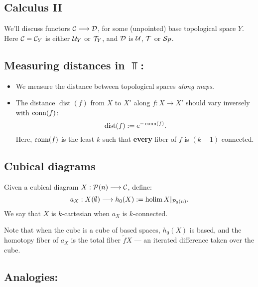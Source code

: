 \documentclass[11pt]{article}
\DeclareMathOperator{\dist}{dist}
\begin{document}
\begin{Calculus II}
\section*{Calculus II}
We'll discuss functors $\mathcal{C}\longrightarrow\mathcal{D}$, for some (unpointed) base topological space $Y$. Here $\mathcal{C}=\mathcal{C}_Y$ is either $\mathcal{U}_Y$ or $\mathcal{T}_Y$, and $\mathcal{D}$ is $\mathcal{U}$, $\mathcal{T}$ or $\mathcal{S} p$.
\subsection*{Measuring distances in $\Top$:}
\begin{itemize}\squishlist
\setlength{\parindent}{.25in}
\item We measure the distance between topological spaces \emph{along maps}.
\item The distance $\dist(f)$ from $X$ to $X'$ along $f:X\to X'$ should vary inversely with $\operatorname{conn}(f)$:
\[\dist(f):=e^{-\conn(f)}.\]
Here, $\operatorname{conn}(f)$ is the least $k$ such that \textbf{every} fiber of $f$ is $(k-1)$-connected.
\end{itemize}
\subsection*{Cubical diagrams}
Given a cubical diagram $X:\mathcal{P}(n)\longrightarrow\mathcal{C}$, %
define:
\[a_X:X(\emptyset )\longrightarrow h_0(X):=\operatorname*{holim} X|_{\mathcal{P}_{0}(n)}.\]
We say that $X$ is $k$-cartesian when $a_X$ is $k$-connected.

Note that when the cube is a cube of based spaces, $h_0(X)$ is based, and the homotopy fiber of $a_X$ is the total fiber $\widetilde{f}X$ --- an iterated difference taken over the cube.

\pagebreak

\subsection*{Analogies:}

\end{Calculus II}
\end{document}
